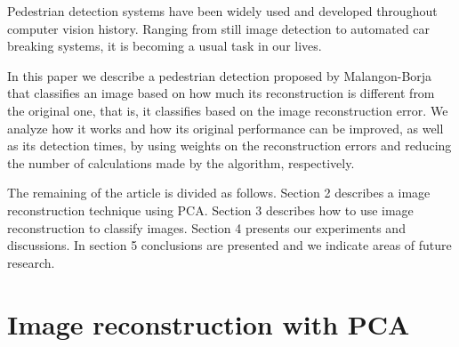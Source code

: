\documentclass[10pt, conference, compsocconf]{IEEEtran}
\begin{document}


Pedestrian detection systems have been widely used and developed throughout computer vision history. Ranging from still image detection to automated car breaking systems, it is becoming a usual task in our lives.

In this paper we describe a pedestrian detection proposed by Malangon-Borja \cite{borja09} that classifies an image based on how much its reconstruction is different from the original one, that is, it classifies based on the image reconstruction error. We analyze how it works and how its original performance can be improved, as well as its detection times, by using weights on the reconstruction errors and reducing the number of calculations made by the algorithm, respectively.

The remaining of the article is divided as follows. Section 2 describes a image reconstruction technique using PCA. Section 3 describes how to use image reconstruction to classify images. Section 4 presents our experiments and discussions. In section 5 conclusions are presented and we indicate areas of future research.

\section{Image reconstruction with PCA}
\end{document}
